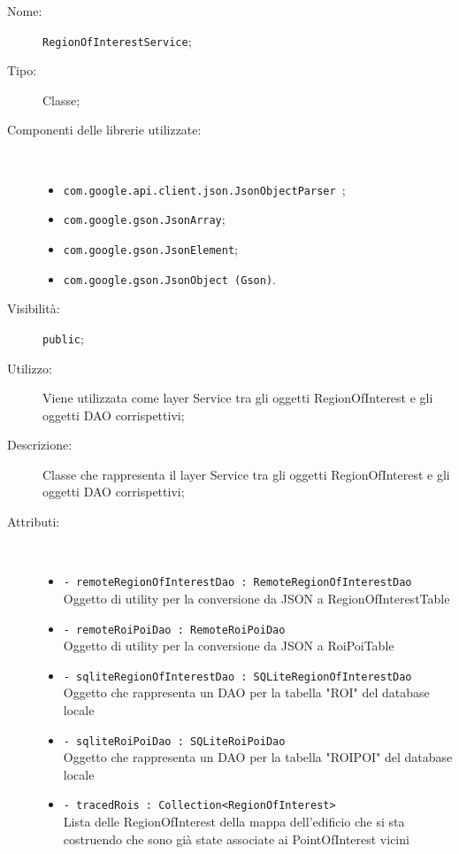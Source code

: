 \documentclass[../DefinizioneDiProdotto.tex]{subfiles}
\begin{document}
\begin{description}
	\item[Nome:] \texttt{RegionOfInterestService};
	\item[Tipo:] Classe;
	\item[Componenti delle librerie utilizzate:] \
	\begin{itemize}
		\item \texttt{com.google.api.client.json.JsonObjectParser
		};
		
		\item \texttt{com.google.gson.JsonArray};
		
		\item \texttt{com.google.gson.JsonElement};
		
		\item \texttt{com.google.gson.JsonObject (Gson)}.
		
	\end{itemize}
	\item[Visibilità:] \texttt{public};
	\item[Utilizzo:] Viene utilizzata come layer Service tra gli oggetti RegionOfInterest e gli oggetti DAO corrispettivi;
	\item[Descrizione:] Classe che rappresenta il layer Service tra gli oggetti RegionOfInterest e gli oggetti DAO corrispettivi;
	\item[Attributi:] \
	\begin{itemize}
		\item \texttt{- remoteRegionOfInterestDao : RemoteRegionOfInterestDao}\\
		Oggetto di utility per la conversione da JSON a RegionOfInterestTable
		
		\item \texttt{- remoteRoiPoiDao : RemoteRoiPoiDao}\\
		Oggetto di utility per la conversione da JSON a RoiPoiTable
		
		\item \texttt{- sqliteRegionOfInterestDao : SQLiteRegionOfInterestDao}\\
		Oggetto che rappresenta un DAO per la tabella "ROI" del database locale
		
		\item \texttt{- sqliteRoiPoiDao : SQLiteRoiPoiDao}\\
		Oggetto che rappresenta un DAO per la tabella "ROIPOI" del database locale
		
		\item \texttt{- tracedRois : Collection<RegionOfInterest>}\\
		Lista delle RegionOfInterest della mappa dell'edificio che si sta costruendo che sono già state associate ai PointOfInterest vicini
		

\end{itemize}
\end{description}
\end{document}
